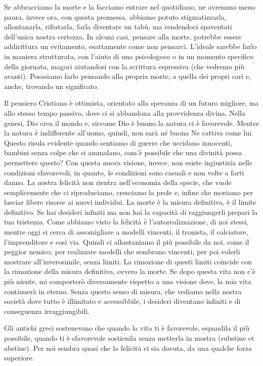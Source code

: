 \documentclass[12pt]{book} %
\begin{document}
Se abbracciamo la morte e la facciamo
entrare nel quotidiano, ne avremmo meno paura, invece ora, con questa promessa, abbiamo potuto stigmatizzarla,
allontanarla, rifiutarla, farla diventare un tabù, ma rendendoci spaventati dell'unica nostra
certezza.
In alcuni casi, pensare alla morte, potrebbe essere addirittura un evitamento, esattamente come non pensarci.
L'ideale sarebbe farlo in maniera strutturata, con l'aiuto di uno psicologoco o in un momento specifico della giornata, magari aiutandosi con la scrittura espressiva (che vedremo più avanti). Posasiamo farlo pensando alla propria morte, a quella dei propri cari e, anche, trovando un significato.

Il pensiero Cristiano è ottimista, orientato alla speranza di un futuro migliore, ma allo stesso tempo passivo, dove ci
si abbandona alla provvidenza divina. Nella genesi, Dio crea il mondo e, siccome Dio è buono la natura ci è favorevole.
Mentre la natura è indifferente all'uomo, quindi, non sarà né buona Ne cattiva come lui. 
Questo risula evidente quando sentiamo di guerre che uccidano innocenti, bambini senza colpe che si ammalano, com'è possibile che una divinità possa permettere questo? Con questa nuova visione, invece, non
esiste ingiustizia nelle condizioni sfavorevoli, in quanto, le condizioni sono casuali e non volte a farti danno. La
nostra felicità non rientra nell'economia della specie, che vuole semplicemente che ci riproduciamo, cresciamo la prole
e, infine che moriamo per lasciar libere risorse ai nuovi individui. La morte è la misura definitiva, è il limite
definitivo. Se hai desideri infiniti ma non hai la capacità di raggiungerli prepari la tua tristezza. Come abbiamo
visto la felicità è l'autorealizzazione, di noi stessi, mentre oggi si cerca di assomigliare a
modelli vincenti, il tronista, il calciatore, l'imprenditore e così via. Quindi ci allontaniamo il
più possibile da noi, come il peggior nemico, per realizzare modelli che sembrano vincenti, per poi volerli mostrare
all'inverosimile, senza limiti. La rimozione di questi limiti coincide con la rimozione della misura definitiva, ovvero
la morte. Se dopo questa vita non c'è più niente, mi comporterò diversamente rispetto a una
visione dove, la mia vita continuerà in eterno. Senza questo senso di misura, che vediamo nella nostra società dove
tutto è illimitato e accessibbile, i desideri diventano infiniti e di conseguenza irraggiungibili.

Gli antichi greci sostenevano che quando la vita ti è favorevole, espandila il più possibile, quando ti è sfavorevole
sostienila senza metterla in mostra (substine et abstine). Per noi sembra quasi che la felicità ci sia dovuta, da una
qualche forza superiore.
\end{document}
